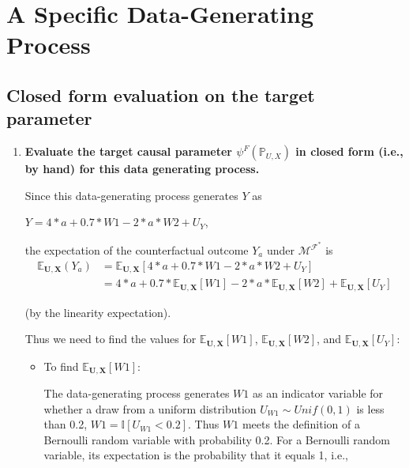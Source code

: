 \documentclass{article}\usepackage[]{graphicx}\usepackage[]{xcolor}
\begin{document}
\pagebreak











\section{A Specific Data-Generating Process}

  \subsection{Closed form evaluation on the target parameter}
  
    \begin{enumerate}[label=\textbf{\arabic*.}]
    
      \item \textbf{Evaluate the target causal parameter $\psi^F(\mathbb{P}_{U,X})$ in closed form (i.e., by hand) for this data generating process.}
      
      Since this data-generating process generates $Y$ as
      
      $Y = 4*a + 0.7 * W1 - 2*a*W2 + U_Y$,
      
      the expectation of the counterfactual outcome $Y_a$ under $\mathcal{M}^{\mathcal{F}^*}$ is
\begin{align}
\mathbb{E}_{\bm{U},\bm{X}}(Y_a) &= \mathbb{E}_{\bm{U},\bm{X}}[4*a + 0.7 * W1 - 2*a*W2 + U_Y] \nonumber \\
&= 4*a + 0.7*\mathbb{E}_{\bm{U},\bm{X}}[W1] - 2*a*\mathbb{E}_{\bm{U},\bm{X}}[W2] + \mathbb{E}_{\bm{U},\bm{X}}[U_Y]
\end{align}

(by the linearity expectation).
      
      Thus we need to find the values for $\mathbb{E}_{\bm{U},\bm{X}}[W1]$, $\mathbb{E}_{\bm{U},\bm{X}}[W2]$, and $\mathbb{E}_{\bm{U},\bm{X}}[U_Y]$:
      
      \begin{itemize}
        
        \item To find $\mathbb{E}_{\bm{U},\bm{X}}[W1]$:
        
        The data-generating process generates $W1$ as an indicator variable for whether a draw from a uniform distribution $U_{W1} \sim Unif(0,1)$ is less than 0.2, 
      $W1 = \mathbb{I}[U_{W1} < 0.2]$. 
      Thus $W1$ meets the definition of a Bernoulli random variable with probability 0.2. For a Bernoulli random variable, its expectation is the probability that it equals 1, i.e., 
      

\end{itemize}
\end{enumerate}
\end{document}
